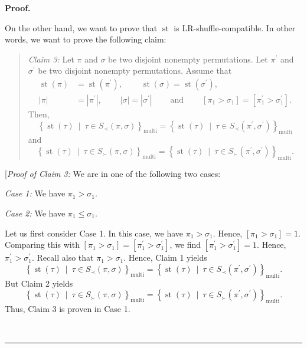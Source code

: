 \documentclass[numbers=enddot,12pt,final,onecolumn,notitlepage]{scrartcl}%
\theoremstyle{definition}
\newenvironment{statement}{\begin{quote}}{\end{quote}}
\newenvironment{proof}[1][Proof]{\noindent\textbf{#1.} }{\ \rule{0.5em}{0.5em}}
\newenvironment{verlong}{}{}
\begin{document}
\begin{verlong}
\begin{proof}
\begin{statement}
\end{statement}

On the other hand, we want to prove that $\operatorname*{st}$ is
LR-shuffle-compatible. In other words, we want to prove the following claim:

\begin{statement}
\textit{Claim 3:} Let $\pi$ and $\sigma$ be two disjoint nonempty
permutations. Let $\pi^{\prime}$ and $\sigma^{\prime}$ be two disjoint
nonempty permutations. Assume that%
\begin{align*}
\operatorname*{st}\left(  \pi\right)   &  =\operatorname*{st}\left(
\pi^{\prime}\right)  ,\ \ \ \ \ \ \ \ \ \ \operatorname*{st}\left(
\sigma\right)  =\operatorname*{st}\left(  \sigma^{\prime}\right)  ,\\
\left\vert \pi\right\vert  &  =\left\vert \pi^{\prime}\right\vert
,\ \ \ \ \ \ \ \ \ \ \left\vert \sigma\right\vert =\left\vert \sigma^{\prime
}\right\vert \ \ \ \ \ \ \ \ \ \ \text{and}\ \ \ \ \ \ \ \ \ \ \left[  \pi
_{1}>\sigma_{1}\right]  =\left[  \pi_{1}^{\prime}>\sigma_{1}^{\prime}\right]
.
\end{align*}
Then,
\[
\left\{  \operatorname*{st}\left(  \tau\right)  \ \mid\ \tau\in S_{\prec
}\left(  \pi,\sigma\right)  \right\}  _{\operatorname*{multi}}=\left\{
\operatorname*{st}\left(  \tau\right)  \ \mid\ \tau\in S_{\prec}\left(
\pi^{\prime},\sigma^{\prime}\right)  \right\}  _{\operatorname*{multi}}%
\]
and%
\[
\left\{  \operatorname*{st}\left(  \tau\right)  \ \mid\ \tau\in S_{\succ
}\left(  \pi,\sigma\right)  \right\}  _{\operatorname*{multi}}=\left\{
\operatorname*{st}\left(  \tau\right)  \ \mid\ \tau\in S_{\succ}\left(
\pi^{\prime},\sigma^{\prime}\right)  \right\}  _{\operatorname*{multi}}.
\]

\end{statement}

[\textit{Proof of Claim 3:} We are in one of the following two cases:

\textit{Case 1:} We have $\pi_{1}>\sigma_{1}$.

\textit{Case 2:} We have $\pi_{1}\leq\sigma_{1}$.

Let us first consider Case 1. In this case, we have $\pi_{1}>\sigma_{1}$.
Hence, $\left[  \pi_{1}>\sigma_{1}\right]  =1$. Comparing this with $\left[
\pi_{1}>\sigma_{1}\right]  =\left[  \pi_{1}^{\prime}>\sigma_{1}^{\prime
}\right]  $, we find $\left[  \pi_{1}^{\prime}>\sigma_{1}^{\prime}\right]
=1$. Hence, $\pi_{1}^{\prime}>\sigma_{1}^{\prime}$. Recall also that $\pi
_{1}>\sigma_{1}$. Hence, Claim 1 yields%
\[
\left\{  \operatorname*{st}\left(  \tau\right)  \ \mid\ \tau\in S_{\prec
}\left(  \pi,\sigma\right)  \right\}  _{\operatorname*{multi}}=\left\{
\operatorname*{st}\left(  \tau\right)  \ \mid\ \tau\in S_{\prec}\left(
\pi^{\prime},\sigma^{\prime}\right)  \right\}  _{\operatorname*{multi}}.
\]
But Claim 2 yields%
\[
\left\{  \operatorname*{st}\left(  \tau\right)  \ \mid\ \tau\in S_{\succ
}\left(  \pi,\sigma\right)  \right\}  _{\operatorname*{multi}}=\left\{
\operatorname*{st}\left(  \tau\right)  \ \mid\ \tau\in S_{\succ}\left(
\pi^{\prime},\sigma^{\prime}\right)  \right\}  _{\operatorname*{multi}}.
\]
Thus, Claim 3 is proven in Case 1.


\end{proof}
\end{verlong}
\end{document}

